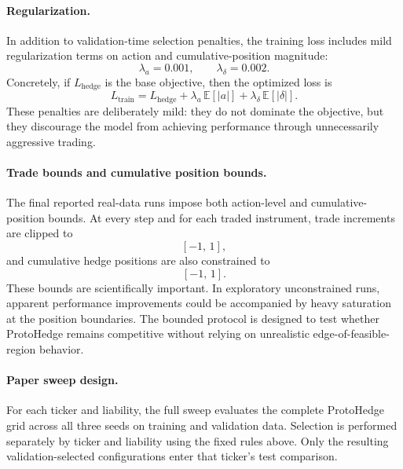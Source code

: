 \documentclass[sigconf]{acmart}
\begin{document}
\paragraph{Regularization.}
In addition to validation-time selection penalties, the training loss includes mild regularization terms on action and cumulative-position magnitude:
\[
\lambda_a = 0.001,
\qquad
\lambda_\delta = 0.002.
\]
Concretely, if $L_{\mathrm{hedge}}$ is the base objective, then the optimized loss is
\[
L_{\mathrm{train}}
=
L_{\mathrm{hedge}}
+
\lambda_a \,\mathbb{E}[|a|]
+
\lambda_\delta \,\mathbb{E}[|\delta|].
\]
These penalties are deliberately mild: they do not dominate the objective, but they discourage the model from achieving performance through unnecessarily aggressive trading.

\paragraph{Trade bounds and cumulative position bounds.}
The final reported real-data runs impose both action-level and cumulative-position bounds. At every step and for each traded instrument, trade increments are clipped to
\[
[-1,\,1],
\]
and cumulative hedge positions are also constrained to
\[
[-1,\,1].
\]
These bounds are scientifically important. In exploratory unconstrained runs, apparent performance improvements could be accompanied by heavy saturation at the position boundaries. The bounded protocol is designed to test whether ProtoHedge remains competitive without relying on unrealistic edge-of-feasible-region behavior.

\paragraph{Paper sweep design.}
For each ticker and liability, the full sweep evaluates the complete
ProtoHedge grid across all three seeds on training and validation data.
Selection is performed separately by ticker and liability using the fixed
rules above. Only the resulting validation-selected configurations enter that
ticker's test comparison.
\end{document}

